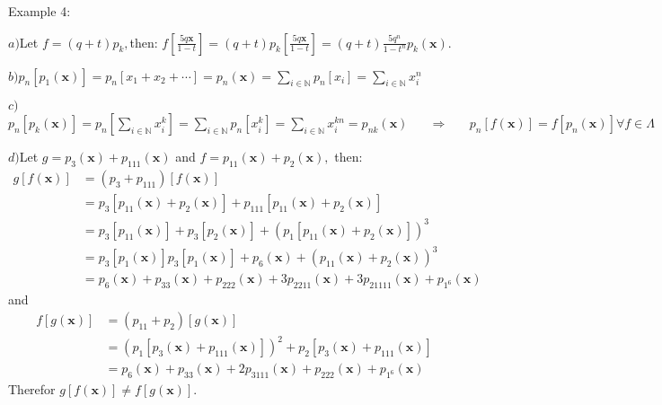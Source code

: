 \documentclass[12pt]{amsart}
\begin{document}
\vspace{-10pt}
\begin{mdframed}[backgroundcolor=green!10]
	\label{exemple plethysme} %
	\begin{it}Example 4: \end{it}

	$a)$\hspace{10pt}Let  $f=(q+t)p_k, $\hspace{20pt}then: \hspace{20pt} $f\left[\frac{5q\bm{x}}{1-t}\right]=(q+t)p_k\left[\frac{5q\bm{x}}{1-t}\right]=(q+t)\frac{5q^n}{1-t^n}p_{k}(\bm{x}).$


	$b)$\hspace{10pt}$p_n[p_1(\bm{x})]=p_n[x_1+x_2+\cdots]=p_n(\bm{x})=\sum_{i\in\mathbb{N}} p_n[x_i]=\sum_{i\in\mathbb{N}} x_i^n$


	$c)$\hspace{10pt}$p_n[p_k(\bm{x})]=p_n\left[\sum_{i\in\mathbb{N}} x_i^k\right]=\sum_{i\in\mathbb{N}} p_n[x_i^k]=\sum_{i\in\mathbb{N}} x_i^{kn}=p_{nk}(\bm{x})\hspace{20pt} \Rightarrow\hspace{20pt} p_n[f(\bm{x})]=f[p_n(\bm{x})] \forall f\in\Lambda$

	$d)$\hspace{10pt}Let $g=p_3(\bm{x})+p_{111}(\bm{x})$ and $f=p_{11}(\bm{x})+p_2(\bm{x}),$ then:
	\begin{align*} g[f(\bm{x})]&=(p_3+p_{111})[f(\bm{x})]
		\\				&=p_3[p_{11}(\bm{x})+p_2(\bm{x})]+p_{111}[p_{11}(\bm{x})+p_2(\bm{x})]
		\\				&=p_3[p_{11}(\bm{x})]+p_3[p_2(\bm{x})]+(p_{1}[p_{11}(\bm{x})+p_2(\bm{x})])^3
		\\				&=p_3[p_1(\bm{x})]p_3[p_1(\bm{x})]+p_{6}(\bm{x})+(p_{11}(\bm{x})+p_2(\bm{x}))^3
		\\				&=p_{6}(\bm{x})+p_{33}(\bm{x})+p_{222}(\bm{x})+3p_{2211}(\bm{x})+3p_{21111}(\bm{x})+p_{1^6}(\bm{x})
	\end{align*}
	and
	\begin{align*} f[g(\bm{x})]&=(p_{11}+p_2)[g(\bm{x})]
		\\				&=(p_1[p_3(\bm{x})+p_{111}(\bm{x})])^2+p_2[p_3(\bm{x})+p_{111}(\bm{x})]
		\\				&=p_6(\bm{x})+p_{33}(\bm{x})+2p_{3111}(\bm{x})+p_{222}(\bm{x})+p_{1^6}(\bm{x})
	\end{align*}
	Therefor $g[f(\bm{x})]\not=f[g(\bm{x})]$.

	\hyperref[retour plethysme]{}
\end{mdframed}
\end{document}
